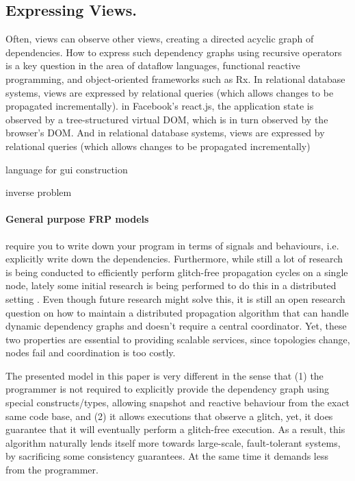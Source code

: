 \subsection{Expressing Views.} Often, views can observe other views, creating a directed acyclic graph of dependencies. How to express such dependency graphs using recursive operators is a key question in the area of dataflow languages, functional reactive programming, and object-oriented frameworks such as Rx. In relational database systems, views are expressed by relational queries (which allows changes to be propagated incrementally). in Facebook's react.js, the application state is observed by a tree-structured virtual DOM, which is in turn observed by the browser's DOM. And in relational database systems, views are expressed by relational queries (which allows changes to be propagated incrementally)

 


 
 
\cite{burckhardt-leijen-yi-sadowski-ball-OOPSLA11}
\cite{camil}


\cite{alive}
\cite{react}

\cite{elm} language for gui construction

\cite{statelines} inverse problem



\paragraph{General purpose FRP models} \cite{reactivesurvey} require you to write down your program in terms of signals and behaviours, i.e. explicitly write down the dependencies. Furthermore, while still a lot of research is being conducted to efficiently perform glitch-free propagation cycles on a single node, lately some initial research is being performed to do this in a distributed setting \cite{elm}\cite{drescala}. Even though future research might solve this, it is still an open research question on how to maintain a distributed propagation algorithm that can handle dynamic dependency graphs and doesn't require a central coordinator. Yet, these two properties are essential to providing scalable services, since topologies change, nodes fail and coordination is too costly.

The presented model in this paper is very different in the sense that (1) the programmer is not required to explicitly provide the dependency graph using special constructs/types, allowing snapshot and reactive behaviour from the exact same code base, and (2) it allows executions that observe a glitch, yet, it does guarantee that it will eventually perform a glitch-free execution. As a result, this algorithm naturally lends itself more towards large-scale, fault-tolerant systems, by sacrificing some consistency guarantees. At the same time it demands less from the programmer. \newline


